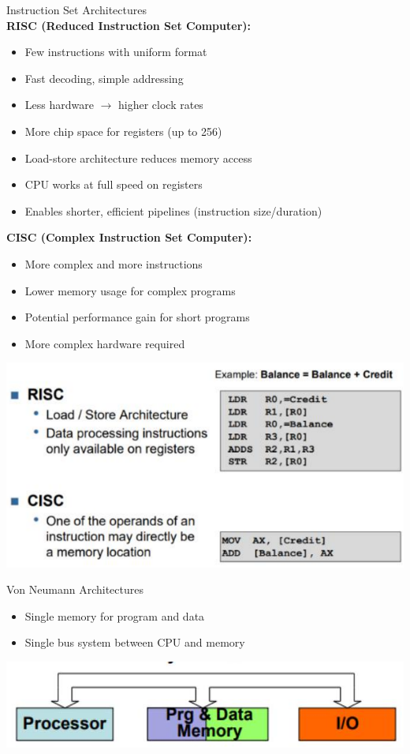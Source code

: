 \begin{concept}{Instruction Set Architectures}\\
\textbf{RISC (Reduced Instruction Set Computer):}
\begin{itemize}
  \item Few instructions with uniform format
  \item Fast decoding, simple addressing
  \item Less hardware $\rightarrow$ higher clock rates
  \item More chip space for registers (up to 256)
  \item Load-store architecture reduces memory access
  \item CPU works at full speed on registers
  \item Enables shorter, efficient pipelines (instruction size/duration)
\end{itemize}

\textbf{CISC (Complex Instruction Set Computer):}
\begin{itemize}
  \item More complex and more instructions
  \item Lower memory usage for complex programs
  \item Potential performance gain for short programs
  \item More complex hardware required
\end{itemize}

\includegraphics[width=\linewidth]{images/risc_cisc.png}
\end{concept}

\begin{definition}{Von Neumann Architectures}
\begin{itemize}
  \item Single memory for program and data
  \item Single bus system between CPU and memory
\end{itemize}

\includegraphics[width=0.7\linewidth]{images/2024_12_29_79e6b22f503fb7b4f718g-13}
\end{definition}


